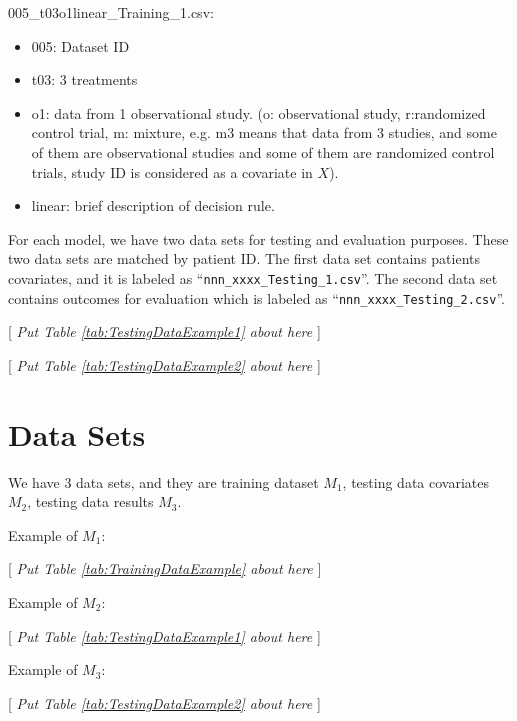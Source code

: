 \documentclass[12pt]{article}
\begin{document}
005\_t03o1linear\_Training\_1.csv:
\begin{itemize}
	\item 005: Dataset ID
	\item t03: 3 treatments
	\item o1: data from 1 observational study. (o: observational study, r:randomized control trial, m: mixture, e.g. m3 means that data from 3 studies, and some of them are observational studies and some of them are randomized control trials, study ID is considered as a covariate in $X$).
	\item linear: brief description of decision rule.
\end{itemize}







For each model, we have two data sets for testing and evaluation purposes. These two data sets are matched by patient ID.
The first data set contains patients covariates, and it is labeled as ``\verb"nnn_xxxx_Testing_1.csv"''. The second data set contains outcomes for evaluation which is labeled as ``\verb"nnn_xxxx_Testing_2.csv"''.

\begin{center}
	{[ \textsl{Put Table \ref{tab:TestingDataExample1} about here} ]}
\end{center}

\begin{center}
	{[ \textsl{Put Table \ref{tab:TestingDataExample2} about here} ]}
\end{center}


\section{Data Sets} \label{sec.DataSetsExplained}
We have 3 data sets, and they are training dataset $M_1$, testing data covariates $M_2$, testing data results $M_3$.

Example of $M_1$:
\begin{center}
	{[ \textsl{Put Table \ref{tab:TrainingDataExample} about here} ]}
\end{center}

Example of $M_2$:
\begin{center}
	{[ \textsl{Put Table \ref{tab:TestingDataExample1} about here} ]}
\end{center}

Example of $M_3$:
\begin{center}
	{[ \textsl{Put Table \ref{tab:TestingDataExample2} about here} ]}
\end{center}
\end{document}

